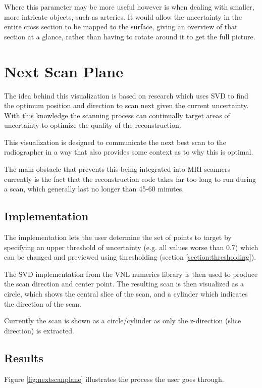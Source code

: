 Where this parameter may be more useful however is when dealing with smaller, more intricate objects, such as arteries. It would allow the uncertainty in the entire cross section to be mapped to the surface, giving an overview of that section at a glance, rather than having to rotate around it to get the full picture.

\newpage
\section{Next Scan Plane}\label{section:nextscanplane}
The idea behind this visualization is based on research\cite{uncertaintysvd} which uses SVD to find the optimum position and direction to scan next given the current uncertainty. With this knowledge the scanning process can continually target areas of uncertainty to optimize the quality of the reconstruction.

This visualization is designed to communicate the next best scan to the radiographer in a way that also provides some context as to why this is optimal.

The main obstacle that prevents this being integrated into MRI scanners currently is the fact that the reconstruction code takes far too long to run during a scan, which generally last no longer than 45-60 minutes.

\subsection*{Implementation}
The implementation lets the user determine the set of points to target by specifying an upper threshold of uncertainty (e.g. all values worse than 0.7) which can be changed and previewed using thresholding (section \ref{section:thresholding}).

The SVD implementation from the VNL numerics library is then used to produce the scan direction and center point. The resulting scan is then visualized as a circle, which shows the central slice of the scan, and a cylinder which indicates the direction of the scan.

Currently the scan is shown as a circle/cylinder as only the z-direction (slice direction) is extracted.

\subsection*{Results}

Figure \ref{fig:nextscanplane} illustrates the process the user goes through.

